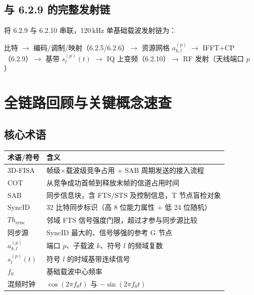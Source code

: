 \documentclass[11pt,a4paper]{ctexart}
\begin{document}
\subsection{与 6.2.9 的完整发射链}

将 6.2.9 与 6.2.10 串联，120\,kHz 单基础载波发射链为：

\begin{center}
比特 $\rightarrow$ 编码/调制/映射（6.2.5/6.2.6）$\rightarrow$ 资源网格 $a_{k,l}^{(p)}$
$\rightarrow$ IFFT+CP（6.2.9）$\rightarrow$ 基带 $s_l^{(p)}(t)$
$\rightarrow$ IQ 上变频（6.2.10）$\rightarrow$ RF 发射（天线端口 $p$）
\end{center}

\newpage
\section{全链路回顾与关键概念速查}

\subsection{核心术语}

\begin{table}[h]
\centering
\begin{tabular}{ll}
\toprule
\textbf{术语/符号} & \textbf{含义} \\
\midrule
3D-FISA & 帧级$\times$载波级竞争占用 + SAB 周期发送的接入流程 \\
COT & 从竞争成功首帧到释放末帧的信道占用时间 \\
SAB & 同步信息块，含 FTS/STS 及控制信息，T 节点盲检对象 \\
SyncID & 32 比特同步标识（高 8 位能力属性 + 低 24 位随机） \\
$Th_{\mathrm{sync}}$ & 邻域 FTS 信号强度门限，超过才参与同步源比较 \\
同步源 & SyncID 最大的、信号够强的参考 G 节点 \\
$a_{k,l}^{(p)}$ & 端口 $p$、子载波 $k$、符号 $l$ 的频域复数 \\
$s_l^{(p)}(t)$ & 符号 $l$ 的时域基带连续信号 \\
$f_0$ & 基础载波中心频率 \\
混频时钟 & $\cos(2\pi f_0 t)$ 与 $-\sin(2\pi f_0 t)$ \\
\bottomrule
\end{tabular}
\end{table}
\end{document}
